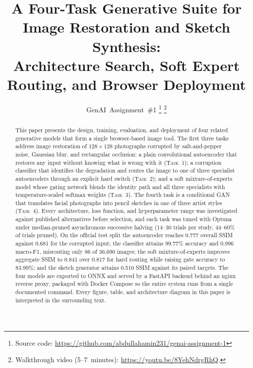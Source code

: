 \documentclass[journal]{IEEEtran}
\newcommand{\taskname}[1]{\textsc{#1}}
\begin{document}
\title{A Four-Task Generative Suite for Image Restoration and Sketch Synthesis:\\
Architecture Search, Soft Expert Routing, and Browser Deployment}

\author{GenAI~Assignment~\#1%
\thanks{Source code: \url{https://github.com/abdullahamin231/genai-assignment-1}}%
\thanks{Walkthrough video (5--7~minutes): \url{https://youtu.be/8YehNdrgRhQ}.}}


\maketitle

\begin{abstract}
This paper presents the design, training, evaluation, and deployment of four related generative models that form a single browser-based image tool. The first three tasks address image restoration of $128\times128$ photographs corrupted by salt-and-pepper noise, Gaussian blur, and rectangular occlusion: a plain convolutional autoencoder that restores any input without knowing what is wrong with it (\taskname{Task~1}); a corruption classifier that identifies the degradation and routes the image to one of three specialist autoencoders through an explicit hard switch (\taskname{Task~2}); and a soft mixture-of-experts model whose gating network blends the identity path and all three specialists with temperature-scaled softmax weights (\taskname{Task~3}). The fourth task is a conditional GAN that translates facial photographs into pencil sketches in one of three artist styles (\taskname{Task~4}). Every architecture, loss function, and hyperparameter range was investigated against published alternatives before selection, and each task was tuned with Optuna under median-pruned asynchronous successive halving (14--30 trials per study, 44--60\% of trials pruned). On the official test split the autoencoder reaches 0.777 overall SSIM against 0.681 for the corrupted input; the classifier attains 99.77\% accuracy and 0.996 macro-F1, misrouting only 86 of 36{,}690 images; the soft mixture-of-experts improves aggregate SSIM to 0.841 over 0.817 for hard routing while raising gate accuracy to 83.99\%; and the sketch generator attains 0.510 SSIM against its paired targets. The four models are exported to ONNX and served by a FastAPI backend behind an nginx reverse proxy, packaged with Docker Compose so the entire system runs from a single documented command. Every figure, table, and architecture diagram in this paper is interpreted in the surrounding text.
\end{abstract}
\end{document}
